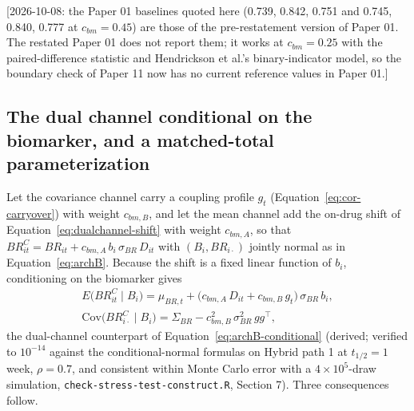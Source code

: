 \documentclass[11pt]{article}
\newcommand{\note}[1]{\textcolor{blue!60!black}{\small [#1]}}
\newcommand{\code}[1]{\texttt{#1}}
\begin{document}
\note{2026-10-08: the Paper 01 baselines quoted here (0.739, 0.842,
0.751 and 0.745, 0.840, 0.777 at $c_{bm} = 0.45$) are those of the
pre-restatement version of Paper 01. The restated Paper 01 does not report
them; it works at $c_{bm} = 0.25$ with the paired-difference statistic
and Hendrickson et al.'s binary-indicator model, so the boundary check
of Paper 11 now has no current reference values in Paper 01.}

\subsection{The dual channel conditional on the biomarker, and a
matched-total parameterization}
\label{sec:invd-dc-cond}

Let the covariance channel carry a coupling profile $g_t$
(Equation~\eqref{eq:cor-carryover}) with weight $c_{bm,B}$, and let the
mean channel add the on-drug shift of
Equation~\eqref{eq:dualchannel-shift} with weight $c_{bm,A}$, so that
$BR^{C}_{it} = BR_{it} + c_{bm,A}\, b_i\, \sigma_{BR}\, D_{it}$ with
$(B_i, BR_{i\cdot})$ jointly normal as in Equation~\eqref{eq:archB}.
Because the shift is a fixed linear function of $b_i$, conditioning on
the biomarker gives
\begin{equation}
\begin{gathered}
E\big(BR^{C}_{it} \mid B_i\big) = \mu_{BR,t} +
  \big(c_{bm,A}\, D_{it} + c_{bm,B}\, g_t\big)\, \sigma_{BR}\, b_i, \\
\mathrm{Cov}\big(BR^{C}_{i\cdot} \mid B_i\big) = \Sigma_{BR} -
  c_{bm,B}^2\, \sigma_{BR}^2\, g g^{\top},
\end{gathered}
\label{eq:invd-dc-cond}
\end{equation}
the dual-channel counterpart of Equation~\eqref{eq:archB-conditional}
(derived; verified to $10^{-14}$ against the conditional-normal
formulas on Hybrid path 1 at $t_{1/2} = 1$ week, $\rho = 0.7$, and
consistent within Monte Carlo error with a $4 \times 10^5$-draw
simulation, \code{check-stress-test-construct.R}, Section 7). Three consequences
follow.
\end{document}
